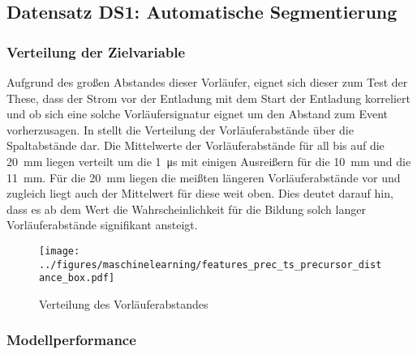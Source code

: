 \subsection{Datensatz DS1: Automatische Segmentierung}

\subsubsection{Verteilung der Zielvariable}
Aufgrund des großen Abstandes dieser Vorläufer, eignet sich dieser zum Test der These, dass der Strom vor der Entladung mit dem Start der Entladung korreliert und ob sich eine solche Vorläufersignatur eignet um den Abstand zum Event vorherzusagen. In  stellt die Verteilung der Vorläuferabstände über die Spaltabstände dar. Die Mittelwerte der Vorläuferabstände für all bis auf die \SI{20}{\milli\meter} liegen verteilt um die \SI{1}{\micro\second} mit einigen Ausreißern für die \SI{10}{\milli\meter} und die \SI{11}{\milli\meter}. Für die \SI{20}{\milli\meter} liegen die meißten längeren Vorläuferabstände vor und zugleich liegt auch der Mittelwert für diese weit oben. Dies deutet darauf hin, dass es ab dem Wert die Wahrscheinlichkeit für die Bildung solch langer Vorläuferabstände signifikant ansteigt.


\begin{figure}[H]
    \centering
      \texttt{[image: ../figures/maschinelearning/features\_prec\_ts\_precursor\_distance\_box.pdf]}
      \caption{Verteilung des Vorläuferabstandes}
      \label{fig:prec_ts_prec_distance_box}
\end{figure}

\subsubsection{Modellperformance}

\begin{table}[h!]
\centering
\caption{Model Performance für die Vorhersage der Vorläuferabstände}
\label{tab:prec_distance}
\end{table}

